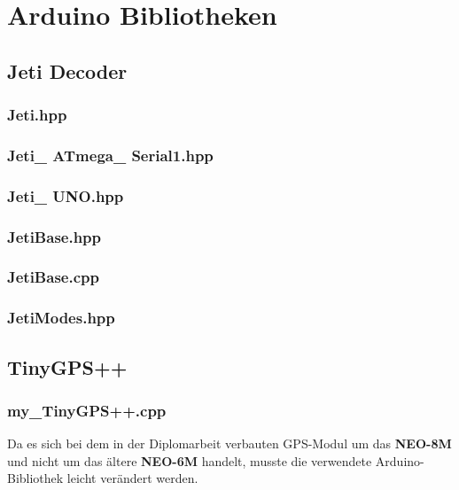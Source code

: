\section{Arduino Bibliotheken}
\subsection{Jeti Decoder}
\subsubsection{Jeti.hpp}

\subsubsection{Jeti\_ ATmega\_ Serial1.hpp}

\subsubsection{Jeti\_ UNO.hpp}

\subsubsection{JetiBase.hpp}

\subsubsection{JetiBase.cpp}


\newpage
\subsubsection{JetiModes.hpp}

\subsection{TinyGPS++}
\subsubsection{my\_TinyGPS++.cpp}
Da es sich bei dem in der Diplomarbeit verbauten GPS-Modul um das \textbf{NEO-8M} 
und nicht um das ältere \textbf{NEO-6M} handelt, musste die verwendete Arduino-Bibliothek leicht verändert werden.
